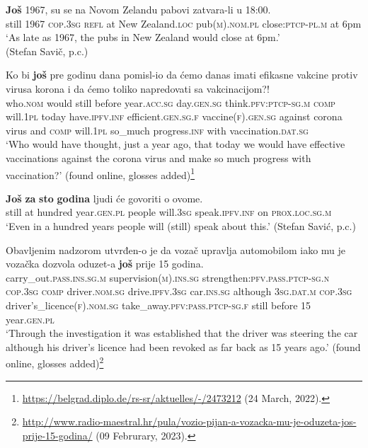 \begin{exe}
	\ex\label{exappendixBCMSTimeScalar1}
	\gll \textbf{Još} 1967, su se na {Novom Zelandu} pabovi zatvara-li u 18:00.\\
	still 1967 \textsc{cop}.3\textsc{sg} \textsc{refl} at {New Zealand.\textsc{loc}} pub(\textsc{m}).\textsc{nom}.\textsc{pl} close:\textsc{ptcp}-\textsc{pl}.\textsc{m} at 6pm\\
	\glt \lq As late as 1967, the pubs in New Zealand would close at 6pm.'
	\\(Stefan Savič, p.c.)

	\ex\label{exappendixBCMSTimeScalar2}
	\gll Ko bi \textbf{još} pre godinu dana pomisl-io da ćemo danas imati efikasne vakcine protiv {virusa korona} i da ćemo toliko napredovati sa vakcinacijom?!\\
	who.\textsc{nom} would still before year.\textsc{acc}.\textsc{sg} day.\textsc{gen}.\textsc{sg} think.\textsc{pfv}:\textsc{ptcp}-\textsc{sg}.\textsc{m} \textsc{comp}  will.1\textsc{pl} today have.\textsc{ipfv}.\textsc{inf} efficient.\textsc{gen}.\textsc{sg}.\textsc{f} vaccine(\textsc{f}).\textsc{gen}.\textsc{sg} against {corona virus} and \textsc{comp} will.1\textsc{pl} so\_much progress.\textsc{inf} with vaccination.\textsc{dat}.\textsc{sg}\\
	\glt \lq Who would have thought, just a year ago, that today we would have effective vaccinations against the corona virus and make so much progress with vaccination?' (found online, glosses added)\footnote{\url{https://belgrad.diplo.de/rs-sr/aktuelles/-/2473212} (24 March, 2022).}
	
	\pagebreak
	\ex\label{exappendixBCMSTimeScalar3}
	\gll \textbf{Još} \textbf{za} \textbf{sto} \textbf{godina} ljudi će govoriti o ovome.\\
	still at hundred year.\textsc{gen}.\textsc{pl} people will.3\textsc{sg} speak.\textsc{ipfv}.\textsc{inf} on \textsc{prox}.\textsc{loc}.\textsc{sg}.\textsc{m}\\
	\glt \lq Even in a hundred years people will (still) speak about this.\rq{ }(Stefan Savić, p.c.)
	
		\ex\label{exappendixBCMSTimeScalar4}
	\gll Obavljenim nadzorom utvrđen-o je da vozač upravlja automobilom iako mu je {vozačka dozvola} oduzet-a \textbf{još} prije 15 godina.\\
	carry\_out.\textsc{pass}.\textsc{ins}.\textsc{sg}.\textsc{m} supervision(\textsc{m}).\textsc{ins}.\textsc{sg} strengthen:\textsc{pfv.}\textsc{pass}.\textsc{ptcp}-\textsc{sg}.\textsc{n} \textsc{cop}.3\textsc{sg} \textsc{comp} driver.\textsc{nom}.\textsc{sg} drive.\textsc{ipfv}.3\textsc{sg} car.\textsc{ins}.\textsc{sg} although 3\textsc{sg}.\textsc{dat}.\textsc{m} \textsc{cop}.3\textsc{sg} driver's\_licence(\textsc{f}).\textsc{nom}.\textsc{sg}  take\_away.\textsc{pfv}:\textsc{pass}.\textsc{ptcp}-\textsc{sg}.\textsc{f} still before 15 year.\textsc{gen}.\textsc{pl}\\
\glt \lq Through the investigation it was established that the driver was steering the car although his driver's licence had been revoked as far back as 15 years ago.' (found online, glosses added)\footnote{\url{http://www.radio-maestral.hr/pula/vozio-pijan-a-vozacka-mu-je-oduzeta-jos-prije-15-godina/} (09 Februrary, 2023).}
	

\end{exe}
